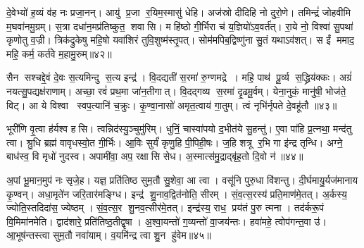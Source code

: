 दे॒वेभ्यो॑ ह॒व्यं व॑ह नः प्रजा॒नन्। आयु॑ प्र॒जा र॒यिम॒स्मासु॑ धेहि। अज॑स्रो दीदिहि नो दुरो॒णे। तमिन्द्रं॑ जोहवीमि म॒घवा॑नमु॒ग्रम्। स॒त्रा दधा॑न॒मप्र॑तिष्कुत॒ शवासि। महि॑ष्ठो गी॒र्भिरा च॑ य॒ज्ञियो॑ऽव॒वर्त॑त्। रा॒ये नो॒ विश्वा॑ सु॒पथा॑ कृणोतु व॒ज्री। त्रिक॑द्रुकेषु महि॒षो यवा॑शिरं तुवि॒शुष्म॑स्तृ॒पत्। सोम॑मपिब॒द्विष्णु॑ना सु॒तं यथाऽव॑शत्। स ईं ममाद॒ महि॒ कर्म॒ कर्त॑वे म॒हामु॒रुम्॥४२॥

सैन सश्चद्दे॒वं दे॒वः स॒त्यमिन्दु स॒त्य इन्द्र॑। वि॒दद्यती॑ स॒रमा॑ रु॒ग्णमद्रे। महि॒ पाथ॑ पू॒र्व्य स॒द्ध्रिय॑क्कः। अग्रं॑ नयत्सु॒पद्यक्ष॑राणाम्। अच्छा॒ रवं॑ प्रथ॒मा जा॑न॒तीगात्। वि॒दद्गव्य स॒रमा॑ दृ॒ढमू॒र्वम्। येना॒नुकं॒ मानु॑षी॒ भोज॑ते॒ विट्। आ ये विश्वा स्वप॒त्यानि॑ च॒क्रुः। कृ॒ण्वा॒नासो॑ अमृत॒त्वाय॑ गा॒तुम्। त्वं नृभि॑र्नृपते दे॒वहू॑तौ ॥४३॥

भूरी॑णि वृ॒त्वा ह॑र्यश्व हसि। त्वन्निद॑स्यु॒ञ्चुमु॑रिम्। धुनिं॒ चास्वा॑पयो द॒भीत॑ये सु॒हन्तु॑। ए॒वा पा॑हि प्र॒त्नथा॒ मन्द॑तु त्वा। श्रु॒धि ब्रह्म॑ वावृधस्वो॒त गी॒र्भिः। आ॒विः सुर्यं॑ कृणु॒हि पी॒पिही॒षः। ज॒हि शत्रू र॒भि गा इ॑न्द्र तृन्धि। अग्ने॒ बाध॑स्व॒ वि मृधो॑ नुदस्व। अपामी॑वा॒ अप॒ रक्षासि सेध। अ॒स्मात्स॑मु॒द्राद्बृ॑ह॒तो दि॒वो न॑॥४४॥

अ॒पां भू॒मान॒मुप॑ नः सृजे॒ह। यज्ञ॒ प्रति॑तिष्ठ सुम॒तौ सु॒शेवा॒ आ त्वा। वसू॑नि पुरु॒धा वि॑शन्तु। दी॒र्घमायु॒र्यज॑मानाय कृ॒ण्वन्। अधा॒मृते॑न जरि॒तार॑मङ्ग्धि। इन्द्र॑ शु॒नाव॒द्वित॑नोति॒ सीरम्। सं॒व॒त्स॒रस्य॑ प्रति॒माण॑मे॒तत्। अ॒र्कस्य॒ ज्योति॒स्तदिदा॑स॒ ज्येष्ठम्। सं॒व॒त्स॒र शु॒नव॒त्सीर॑मे॒तत्। इन्द्र॑स्य॒ राध॒ प्रय॑तं पु॒रु त्मना। तद॑र्करू॒पं वि॒मिमा॑नमेति। द्वाद॑शारे॒ प्रति॑तिष्ठ॒तीद्वृषा। अ॒श्वा॒यन्तो॑ ग॒व्यन्तो॑ वा॒जय॑न्तः। हवा॑महे॒ त्वोप॑गन्त॒वा उ॑। आ॒भूष॑न्तस्त्वा सुम॒तौ नवा॑याम्। व॒यमि॑न्द्र त्वा शु॒न हु॑वेम॥४५॥



